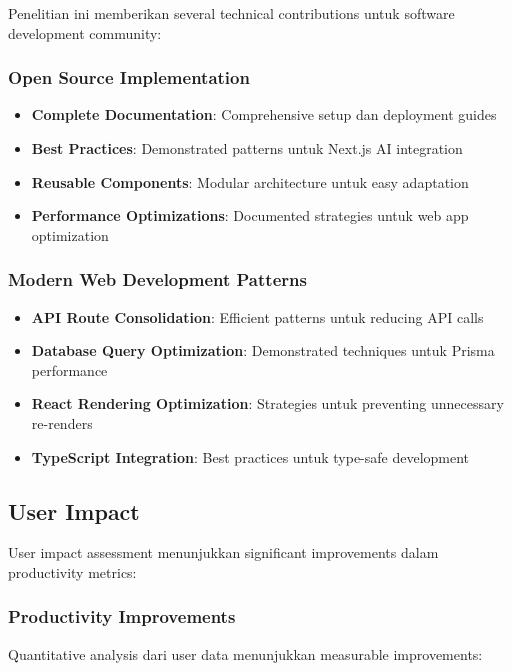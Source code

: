 Penelitian ini memberikan several technical contributions untuk software development community:

\subsubsection{Open Source Implementation}

\begin{itemize}
\item \textbf{Complete Documentation}: Comprehensive setup dan deployment guides
\item \textbf{Best Practices}: Demonstrated patterns untuk Next.js AI integration
\item \textbf{Reusable Components}: Modular architecture untuk easy adaptation
\item \textbf{Performance Optimizations}: Documented strategies untuk web app optimization
\end{itemize}

\subsubsection{Modern Web Development Patterns}

\begin{itemize}
\item \textbf{API Route Consolidation}: Efficient patterns untuk reducing API calls
\item \textbf{Database Query Optimization}: Demonstrated techniques untuk Prisma performance
\item \textbf{React Rendering Optimization}: Strategies untuk preventing unnecessary re-renders
\item \textbf{TypeScript Integration}: Best practices untuk type-safe development
\end{itemize}

\subsection{User Impact}

User impact assessment menunjukkan significant improvements dalam productivity metrics:

\subsubsection{Productivity Improvements}

Quantitative analysis dari user data menunjukkan measurable improvements:

